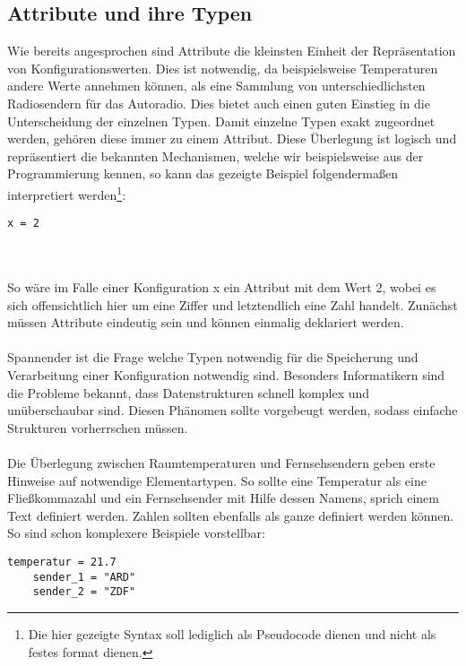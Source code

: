\subsection{Attribute und ihre Typen}
Wie bereits angesprochen sind Attribute die kleinsten Einheit der Repräsentation von Konfigurationswerten. Dies ist notwendig, da beispielsweise Temperaturen andere Werte annehmen können, als eine Sammlung von unterschiedlichsten Radiosendern für das Autoradio. Dies bietet auch einen guten Einstieg in die Unterscheidung der einzelnen Typen. Damit einzelne Typen exakt zugeordnet werden, gehören diese immer zu einem Attribut. Diese Überlegung ist logisch und repräsentiert die bekannten Mechanismen, welche wir beispielsweise aus der Programmierung kennen, so kann das gezeigte Beispiel folgendermaßen interpretiert werden\footnote{Die hier gezeigte Syntax soll lediglich als Pseudocode dienen und nicht als festes format dienen.}:
\lstset{language=bash}
\begin{lstlisting}[caption=Zuweisung eines Attributs als Pseudocode , captionpos=b]
   x = 2
\end{lstlisting}
	
\\\\

So wäre im Falle einer Konfiguration x ein Attribut mit dem Wert 2, wobei es sich offensichtlich hier um eine Ziffer und letztendlich eine Zahl handelt. Zunächst müssen Attribute eindeutig sein und können einmalig deklariert werden. 
\\\\
Spannender ist die Frage welche Typen notwendig für die Speicherung und Verarbeitung einer Konfiguration notwendig sind. Besonders Informatikern sind die Probleme bekannt, dass Datenstrukturen schnell komplex und unüberschaubar sind. Diesen Phänomen sollte vorgebeugt werden, sodass einfache Strukturen vorherrschen müssen. 
\\\\
Die Überlegung zwischen Raumtemperaturen und Fernsehsendern geben erste Hinweise auf notwendige Elementartypen. So sollte eine Temperatur als eine Fließkommazahl und ein Fernsehsender mit Hilfe dessen Namens, sprich einem Text definiert werden. Zahlen sollten ebenfalls als ganze definiert werden können. So sind schon komplexere Beispiele vorstellbar:
\lstset{language=bash}
\begin{lstlisting}[caption=Zuweisung mehrerer Attribute, captionpos=b]
  temperatur = 21.7
	sender_1 = "ARD"
	sender_2 = "ZDF"
\end{lstlisting}


